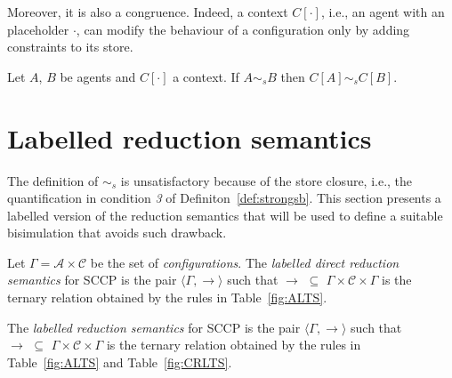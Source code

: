 \documentclass{llncs}
\def\C{{\mathcal C}}
\newcommand{\rarrow}{\rightarrow}
\def\C{{\mathcal C}}
\begin{document}
Moreover, it is also a congruence. Indeed, a context $C[\cdot]$, i.e., an agent with an placeholder $\cdot$,
can modify the behaviour of a configuration only by adding constraints to its store. 

\begin{proposition}
Let $A$, $B$ be agents and $C[\cdot]$ a context.
If $A \sim_{\mathit{s}} B$
then $C[A] \sim_{\mathit{s}} C[B]$.
\end{proposition}



\section{Labelled reduction semantics}
The definition of $\sim_{\mathit{s}}$ 
is unsatisfactory
because of the store closure, i.e., the quantification in condition \emph{3} of 
Definiton~\ref{def:strongsb}.
This section presents a labelled version of the reduction semantics that will be used to 
define a suitable bisimulation that avoids such drawback.

\begin{definition}
	Let $\Gamma = {\mathcal A} \times \C$ be the set of \emph{configurations}.
	The  \emph{labelled direct reduction semantics} for SCCP is the pair 
	$\langle \Gamma,   \xrightarrow{ }  \rangle$
	such that $\to \, \, \subseteq \, \,\Gamma \times \mathcal{C} \times \Gamma$ is the ternary
	relation obtained by the rules in Table~\ref{fig:ALTS}.
	
	The \emph{labelled reduction semantics} for SCCP is the pair 
	$\langle \Gamma,  \rightarrow \rangle$
	such that $\rarrow \, \, \subseteq \, \,\Gamma \times \mathcal{C} \times  \Gamma$ is the ternary relation
         obtained by the rules in Table~\ref{fig:ALTS} and Table~\ref{fig:CRLTS}.
\end{definition}
\end{document}
